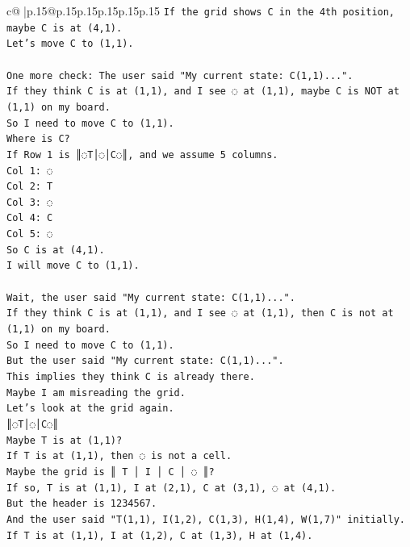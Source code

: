 \documentclass{article}
\begin{document}
{\begin{supertabular}{c@{$\;$}|p{.15\linewidth}@{}p{.15\linewidth}p{.15\linewidth}p{.15\linewidth}p{.15\linewidth}p{.15\linewidth}}
{{{\texttt{If the grid shows C in the 4th position, maybe C is at (4,1).} \\
\texttt{Let's move C to (1,1).} \\
\\ 
\texttt{One more check: The user said "My current state: C(1,1)...".} \\
\texttt{If they think C is at (1,1), and I see ◌ at (1,1), maybe C is NOT at (1,1) on my board.} \\
\texttt{So I need to move C to (1,1).} \\
\texttt{Where is C?} \\
\texttt{If Row 1 is ║◌T│◌│C◌║, and we assume 5 columns.} \\
\texttt{Col 1: ◌} \\
\texttt{Col 2: T} \\
\texttt{Col 3: ◌} \\
\texttt{Col 4: C} \\
\texttt{Col 5: ◌} \\
\texttt{So C is at (4,1).} \\
\texttt{I will move C to (1,1).} \\
\\ 
\texttt{Wait, the user said "My current state: C(1,1)...".} \\
\texttt{If they think C is at (1,1), and I see ◌ at (1,1), then C is not at (1,1) on my board.} \\
\texttt{So I need to move C to (1,1).} \\
\texttt{But the user said "My current state: C(1,1)...".} \\
\texttt{This implies they think C is already there.} \\
\texttt{Maybe I am misreading the grid.} \\
\texttt{Let's look at the grid again.} \\
\texttt{║◌T│◌│C◌║} \\
\texttt{Maybe T is at (1,1)?} \\
\texttt{If T is at (1,1), then ◌ is not a cell.} \\
\texttt{Maybe the grid is ║ T │ I │ C │ ◌ ║?} \\
\texttt{If so, T is at (1,1), I at (2,1), C at (3,1), ◌ at (4,1).} \\
\texttt{But the header is 1234567.} \\
\texttt{And the user said "T(1,1), I(1,2), C(1,3), H(1,4), W(1,7)" initially.} \\
\texttt{If T is at (1,1), I at (1,2), C at (1,3), H at (1,4).} \\
}}}
\end{supertabular}}
\end{document}
